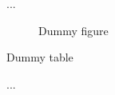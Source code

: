 \documentclass{article}
\begin{document}
...
\begin{figure}
  \caption{Dummy figure}
\end{figure}

\begin{table}
  \caption{Dummy table}
\end{table}
...
\begin{appendix}
  \listoffigures
  \listoftables
\end{appendix}
\end{document}
